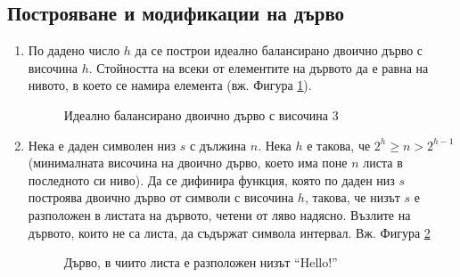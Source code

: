 \documentclass[12pt,a4paper]{article}
\begin{document}
\subsection {Построяване и модификации на дърво}

\begin{enumerate}[resume]

  \item По дадено число $h$ да се построи идеално балансирано двоично дърво с височина $h$. Стойността на всеки от елементите на дървото да е равна на нивото, в което се намира елемента (вж. Фигура \ref{fig:balanced}).

  \begin{figure}
  \centering
  \caption{Идеално балансирано двоично дърво с височина 3}
  \label{fig:balanced}
  \end{figure}

  \item {Нека е даден символен низ $s$ с дължина $n$. Нека $h$ е такова, че $2^h \geq n > 2^{h-1}$ } (минималната височина на двоично дърво, което има поне $n$ листа в последното си ниво). Да се дифинира функция, която по даден низ $s$ построява двоично дърво от символи с височина $h$, такова, че низът $s$ е разположен в листата на дървото, четени от ляво надясно. Възлите на дървото, които не са листа, да съдържат символа интервал. Вж. Фигура \ref{fig:stringleaves}

  \begin{figure}
  \centering
  \caption{Дърво, в чиито листа е разположен низът ``Hello!''}
  \label{fig:stringleaves}
  \end{figure}



\end{enumerate}
\end{document}
